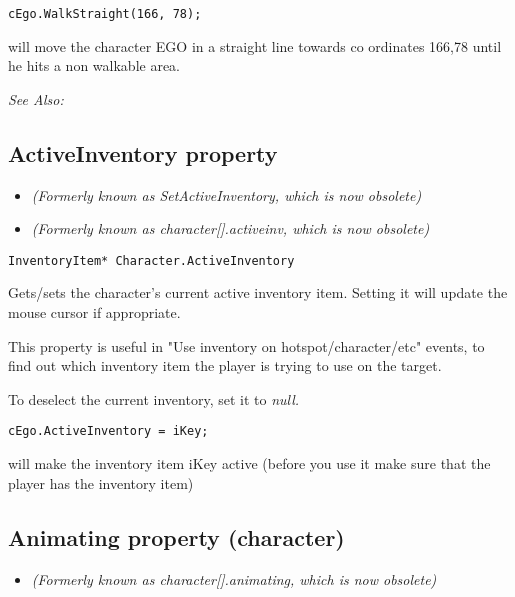 \begin{verbatim}
cEgo.WalkStraight(166, 78);
\end{verbatim}
will move the character EGO in a straight line towards co ordinates 166,78 until he
hits a non walkable area.

\it{See Also:} 


\subsection{ActiveInventory property}\label{Character.ActiveInventory}%

\begin{itemize}
\item \it{(Formerly known as SetActiveInventory, which is now obsolete)}
\item \it{(Formerly known as character[].activeinv, which is now obsolete)}
\end{itemize}

\begin{verbatim}
InventoryItem* Character.ActiveInventory
\end{verbatim}
Gets/sets the character's current active inventory item.
Setting it will update the mouse cursor if appropriate.

This property is useful in "Use inventory on hotspot/character/etc" events, to
find out which inventory item the player is trying to use on the target.

To deselect the current inventory, set it to \it{null}.

\begin{verbatim}
cEgo.ActiveInventory = iKey;
\end{verbatim}
will make the inventory item iKey active (before you use it make sure that the player
has the inventory item)


\subsection{Animating property (character)}\label{Character.Animating}%

\begin{itemize}
\item \it{(Formerly known as character[].animating, which is now obsolete)}
\end{itemize}


